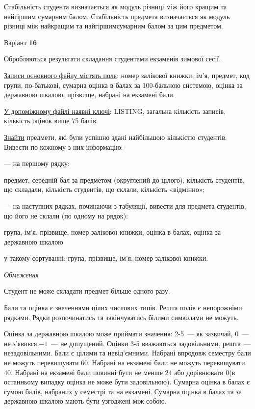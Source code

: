 \documentclass[11pt, ukrainian]{article}
\begin{document}
Стабільність студента визначається як модуль різниці між його кращим та найгіршим сумарним балом.
Стабільність предмета визначається як модуль різниці між найкращим та найгіршимсумарним балом за цим предметом.




\par
\newpage
{\center Варіант  \No \textbf { 16 }\par}
\bigskip
Обробляються результати складання студентами екзаменів зимової сесії.

\underline{Записи основного файлу містять поля}: номер залікової книжки, ім’я, предмет, код групи, по-батько\-ві, сумарна оцінка в балах за 100-бальною системою, оцінка за державною шкалою, прізвище, набрані на екзамені бали.

\underline{У допоміжному файлі наявні ключі}: LISTING, загальна кількість записів, кількість оцінок вище 75 балів.

\underline{Знайти} предмети, які були успішно здані найбільшою кількістю студентів. Вивести по кожному з них інформацію:\par
{\noindent}--- на першому рядку:\par
предмет, середній бал за предметом (округлений до цілого), кількість студентів, що складали, кількість студентів, що склали, кількість «відмінно»;

{\noindent}--- на наступних рядках, починаючи з табуляції, вивести для предмета студентів, що його не склали (по одному на рядок):\par
група, ім’я, прізвище, номер залікової книжки, оцінка в балах, оцінка за державною шкалою

{\noindent}у такому сортуванні: група, прізвище, ім’я, номер залікової книжки.


\bigskip\textit{Обмеження}

Студент не може складати предмет більше одного разу.

Бали та оцінка є значеннями цілих числових типів. Решта полів є непорожніми рядками.
Рядки розпочинатись та закінчуватись білими символами не можуть.

Оцінка за державною шкалою може приймати значення: 2-5~--- як зазвичай, 0~--- не з’явився,$-1$~--- не допущений. 
Оцінки 3-5 вважаються задовільними, решта~--- незадовільними. 
Бали є цілими та невід’ємними.
Набрані впродовж семестру бали не можуть перевищувати 60. 
Набрані на екзамені бали не можуть перевищувати 40. 
Набрані на екзамені бали повинні бути не менше 24 або дорівнювати 0(в останньому випадку оцінка не може бути задовільною). 
Сумарна оцінка в балах є сумою балів, набраних у семестрі та на екзамені.
Сумарна оцінка в балах та за державною шкалою мають бути узгоджені між собою.
\end{document}
